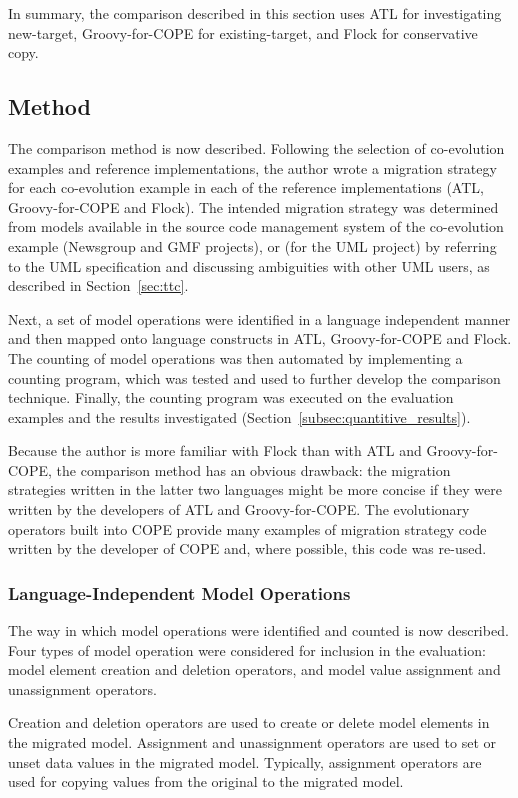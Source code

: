 In summary, the comparison described in this section uses ATL for investigating new-target, Groovy-for-COPE for existing-target, and Flock for conservative copy. 


\subsection{Method}
\label{subsec:quantitive_method}
The comparison method is now described. Following the selection of co-evolution examples and reference implementations, the author wrote a migration strategy for each co-evolution example in each of the reference implementations (ATL, Groovy-for-COPE and Flock). The intended migration strategy was determined from models available in the source code management system of the co-evolution example (Newsgroup and GMF projects), or (for the UML project) by referring to the UML specification and discussing ambiguities with other UML users, as described in Section~\ref{sec:ttc}.

Next, a set of model operations were identified in a language independent manner and then mapped onto language constructs in ATL, Groovy-for-COPE and Flock. The counting of model operations was then automated by implementing a counting program, which was tested and used to further develop the comparison technique. Finally, the counting program was executed on the evaluation examples and the results investigated (Section~\ref{subsec:quantitive_results}).

Because the author is more familiar with Flock than with ATL and Groovy-for-COPE, the comparison method has an obvious drawback: the migration strategies written in the latter two languages might be more concise if they were written by the developers of ATL and Groovy-for-COPE. The evolutionary operators built into COPE provide many examples of migration strategy code written by the developer of COPE and, where possible, this code was re-used.

\subsubsection{Language-Independent Model Operations}
\label{subsubsec:quantitive_model_operations}
The way in which model operations were identified and counted is now described. Four types of model operation were considered for inclusion in the evaluation: model element creation and deletion operators, and model value assignment and unassignment operators. 

Creation and deletion operators are used to create or delete model elements in the migrated model. Assignment and unassignment operators are used to set or unset data values in the migrated model. Typically, assignment operators are used for copying values from the original to the migrated model. 

